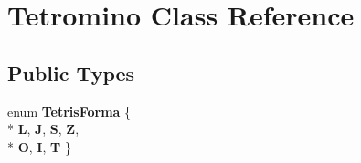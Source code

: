\hypertarget{class_tetromino}{}\section{Tetromino Class Reference}
\label{class_tetromino}
\subsection*{Public Types}
\begin{DoxyCompactItemize}
\item 
enum {\bfseries Tetris\+Forma} \{ \\*
{\bfseries L}, 
{\bfseries J}, 
{\bfseries S}, 
{\bfseries Z}, 
\\*
{\bfseries O}, 
{\bfseries I}, 
{\bfseries T}
 \}\hypertarget{class_tetromino_afb771d0a27c45adeb53186aa7cafd66a}{}\label{class_tetromino_afb771d0a27c45adeb53186aa7cafd66a}

\end{DoxyCompactItemize}
